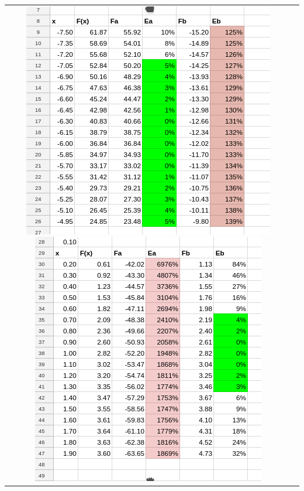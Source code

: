 \begin{Example}
\begin{tabular}{cp{}}
\begin{minipage}{0.45\textwidth}
\includegraphics[width=\textwidth]{figs01/lin_sheet_01.png}
\includegraphics[width=\textwidth]{figs01/lin_sheet_02.png}
\end{minipage}


\end{tabular}
\end{Example}
